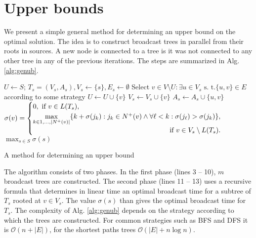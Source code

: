 \section{Upper bounds}

We present a simple general method for determining an upper bound on the optimal solution.
The idea is to construct broadcast trees in parallel from their roots in sources.
A new node is connected to a tree is it was not connected to any other tree in any of the previous iterations.
The steps are summarized in Alg. \ref{alg:genub}.

\begin{algorithm}[]
$U\leftarrow S$;
$T_s=(V_s,A_s), V_s\leftarrow \{s\}, E_s\leftarrow\emptyset$\;
 {
	 {
		Select $v\in V\setminus U:\exists u\in V_s \text{ s. t.} \{u,v\}\in E$ according to some strategy\; 	
		$U\leftarrow U\cup\{v\}$\;
		$V_s\leftarrow V_s\cup\{v\}$\;
		$A_s\leftarrow A_s\cup\{u,v\}$\;
	}
}
 {
$	
\sigma(v)=\begin{cases}
		0, \text{ if } v\in L(T_s),\\
		\max\limits_{k\in 1,\dots,|N^+(v)|}\{k+\sigma(j_k):j_k\in N^+(v)\wedge \forall \ell<k:\sigma(j_\ell)>\sigma(j_k)\},\\
		\hfill \text{ if }v\in V_s\setminus L(T_s).

\end{cases}\;
$
}
\Return $\max_{s\in S}\sigma(s)$\;
 \caption{A method for determining an upper bound}
\label{alg:genub}
\end{algorithm}
The algorithm consists of two phases. 
In the first phase (lines 3 -- 10), $m$ broadcast trees are constructed.
The second phase (lines 11 -- 13) uses a recursive formula that determines in linear time an optimal broadcast time for a subtree of $T_s$ rooted at $v\in V_s$.
The value  $\sigma(s)$ than gives the optimal broadcast time for $T_s$.
The complexity of Alg. \ref{alg:genub} depends on the strategy according to which the trees are constructed.
For common strategies such as BFS and DFS it is $\mathcal{O}(n+|E|)$, for the shortest paths trees $\mathcal{O}(|E| + n\log n)$.


